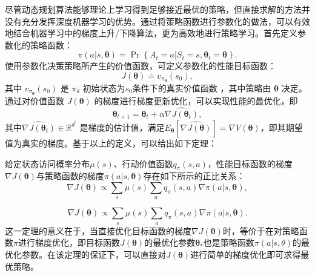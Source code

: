 尽管动态规划算法能够理论上学习得到足够接近最优的策略，但直接求解的方法并没有充分发挥深度机器学习的优势。通过将策略函数进行参数化的做法，可以有效地结合机器学习中的梯度上升/下降算法，更为高效地进行策略学习\cite{sutton1999policy,grondman2012survey}。首先定义参数化的策略函数：
\begin{equation}
\pi ( a | s , \boldsymbol { \theta } ) = \operatorname { Pr } \left\{ A _ { t } = a | S _ { t } = s , \boldsymbol { \theta } _ { t } = \boldsymbol { \theta } \right\}.
\end{equation}
使用参数化决策策略所产生的价值函数，可定义参数化的性能目标函数：
\begin{equation}
    J(\boldsymbol{\theta}) \doteq v_{\pi_{\boldsymbol{\theta}}}\left(s_{0}\right),
\end{equation}
其中 $v_{\pi_{\boldsymbol{\theta}}}\left(s_{0}\right)$ 是 $\pi_\theta$ 初始状态为$s_0$条件下的真实价值函数 ，其中策略由 $\boldsymbol{\theta}$ 决定。通过对价值函数 $J ( \boldsymbol { \theta } )$ 的梯度进行梯度更新优化，可以实现性能的最优化，即
\begin{equation}
\boldsymbol { \theta } _ { t + 1 } = \boldsymbol { \theta } _ { t } + \alpha \widehat { \nabla J \left( \boldsymbol { \theta } _ { t } \right) },
\end{equation}
其中$\widehat { \nabla J \left( \boldsymbol { \theta } _ { t } \right) } \in \mathbb { R } ^ { d ^ { \prime } }$ 是梯度的估计值，满足$E_\boldsymbol{\theta}\left[\widehat { \nabla J \left( \boldsymbol { \theta } \right) }\right]=\nabla V(\boldsymbol{\theta})$，即其期望值为真实的梯度。基于以上的定义，可以给出如下定理：
\begin{theorem}
给定状态访问概率分布$\mu(s)$、行动价值函数$q_\pi(s,a)$，性能目标函数的梯度$\nabla J(\boldsymbol{\theta})$与策略函数的梯度$\pi(a | s, \boldsymbol{\theta})$存在如下所示的正比关系：
\begin{equation}
    \nabla J(\boldsymbol{\theta}) \propto \sum_{s} \mu(s) \sum_{a} q_{\pi}(s, a) \nabla \pi(a | s, \boldsymbol{\theta}),
\end{equation}
\end{theorem}
\begin{equation}
    \nabla J(\boldsymbol{\theta}) \propto \sum_{s} \mu(s) \sum_{a} q_{\pi}(s, a) \nabla \pi(a | s, \boldsymbol{\theta}).
\end{equation}
这一定理的意义在于，当直接优化目标函数的梯度$\nabla J(\boldsymbol{\theta})$时，等价于在对策略函数$\pi$进行梯度优化，即目标函数$J(\boldsymbol{\theta})$的最优化参数$\boldsymbol{\theta_*}$也是策略函数$\pi(a|s,\theta)$的最优化参数。在该定理的保证下，可以直接对$J(\boldsymbol{\theta})$进行简单的梯度优化即可求得最优策略。


